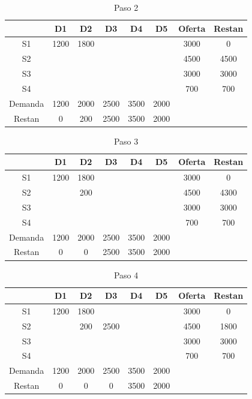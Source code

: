 \documentclass[12pt]{article}  %
\begin{document}
\begin{table}[H]
\centering
\caption{Paso 2}
\label{tab:Paso2Prob5}
\begin{tabular}{c|ccccc|cc}
& D1 & D2 & D3 & D4 & D5 & Oferta & Restan\\
\hline
S1 & 1200 & \cellcolor{yellow}1800 &  &  &  & 3000 & 0 \\
S2 &  &  &  &  &  & 4500 & 4500 \\
S3 &  &  &  &  &  & 3000 & 3000 \\
S4 &  &  &  &  &  & 700 & 700 \\
\hline
Demanda & 1200 & 2000 & 2500 & 3500 & 2000 && \\
Restan & 0 & 200 & 2500 & 3500 & 2000 &&
\end{tabular}
\end{table}

\begin{table}[H]
\centering
\caption{Paso 3}
\label{tab:Paso3Prob5}
\begin{tabular}{c|ccccc|cc}
& D1 & D2 & D3 & D4 & D5 & Oferta & Restan\\
\hline
S1 & 1200 & 1800 &  &  &  & 3000 & 0 \\
S2 &  & \cellcolor{yellow}200 &  &  &  & 4500 & 4300 \\
S3 &  &  &  &  &  & 3000 & 3000 \\
S4 &  &  &  &  &  & 700 &700 \\
\hline
Demanda & 1200 & 2000 & 2500 & 3500 & 2000 & & \\
Restan & 0 & 0 & 2500 & 3500 & 2000 &&
\end{tabular}
\end{table}

\begin{table}[H]
\centering
\caption{Paso 4}
\label{tab:Paso4Prob5}
\begin{tabular}{c|ccccc|cc}
& D1 & D2 & D3 & D4 & D5 & Oferta & Restan\\
\hline
S1 & 1200 & 1800 &  &  &  & 3000 & 0 \\
S2 &  & 200 & \cellcolor{yellow}2500 &  &  & 4500 & 1800 \\
S3 &  &  &  &  &  & 3000 & 3000 \\
S4 &  &  &  &  &  & 700 &700 \\
\hline
Demanda & 1200 & 2000 & 2500 & 3500 & 2000 & & \\
Restan & 0 & 0 & 0 & 3500 & 2000 &&
\end{tabular}
\end{table}
\end{document}

